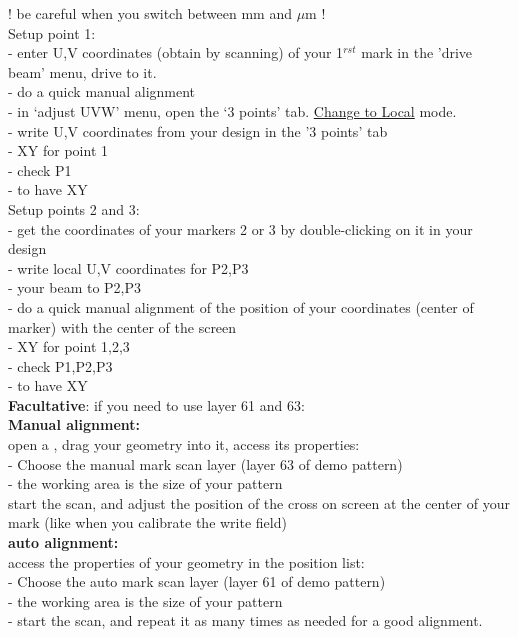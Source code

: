 \documentclass[12pt,a4paper]{report}
\begin{document}
\begin{enumerate}
! be careful when you switch between mm and $\mu$m !\\

Setup point 1:\\
- enter U,V coordinates (obtain by scanning) of your 1$^{rst}$ mark in the 'drive beam' menu, drive to it.\\
- do a quick manual alignment\\
- in `adjust UVW' menu, open the `3 points' tab. \underline{Change to Local} mode.\\
- write U,V coordinates from your design in the '3 points' tab\\
-  XY for point 1\\
- check P1\\
-  to have XY\\


Setup points 2 and 3:\\
- get the coordinates of your markers 2 or 3 by double-clicking on it in your design\\
- write local U,V coordinates for P2,P3\\
-  your beam to P2,P3\\
- do a quick manual alignment of the position of your coordinates (center of marker) with the center of the screen\\
-  XY for point 1,2,3\\
- check P1,P2,P3\\
-  to have XY\\

\textbf{Facultative}: if you need to use layer 61 and 63:\\

\textbf{Manual alignment:}\\
open a , drag your geometry into it, access its properties:\\
- Choose the manual mark scan layer (layer 63 of demo pattern)\\
- the working area is the size of your pattern\\

start the scan, and adjust the position of the cross on screen at the center of your mark (like when you calibrate the write field)\\

\textbf{auto alignment:}\\
access the properties of your geometry in the position list:\\
- Choose the auto mark scan layer (layer 61 of demo pattern)\\
- the working area is the size of your pattern\\
- start the scan, and repeat it as many times as needed for a good alignment.\\


\end{enumerate}
\end{document}
